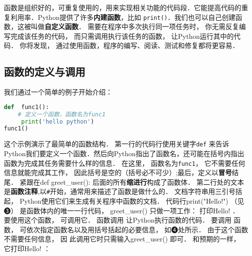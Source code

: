 函数是组织好的，可重复使用的，用来实现相关功能的代码段．它能提高代码的重复利用率．Python提供了许多\textbf{内建函数}，比如 \verb|print()|．我们也可以自己创建函数，这被叫做\textbf{自定义函数}． 需要在程序中多次执行同一项任务时， 你无需反复编写完成该任务的代码， 而只需调用执行该任务的函数， 让Python运行其中的代码． 你将发现， 通过使用函数，程序的编写、阅读、测试和修复都将更容易．

\subsection{函数的定义与调用}
我们通过一个简单的例子开始介绍：
\begin{lstlisting}[language=python]
def  func1():
    # 定义一个函数，函数名为func1
     print('hello python')
func1()
\end{lstlisting}
这个示例演示了最简单的函数结构． 第一行的代码行使用关键字\verb|def| 来告诉Python我们要定义一个函数．然后向Python指出了函数名，还可能在括号内指出函数为完成其任务需要什么样的信息． 在这里， 函数名为\verb|func1|， 它不需要任何信息就能完成其工作， 因此括号是空的（括号必不可少）;最后，定义以\textbf{冒号}结尾．
紧跟在def greet_user(): 后面的所有\textbf{缩进行}构成了函数体． 第二行处的文本是\textbf{函数注释},以\verb|#|开始，通常用来描述了函数是做什么的． 文档字符串用三引号括起， Python使用它们来生成有关程序中函数的文档．
代码行print("Hello!") （见❸） 是函数体内的唯一一行代码， greet_user() 只做一项工作： 打印Hello! ．
要使用这个函数， 可调用它． 函数调用 让Python执行函数的代码． 要调用 函数， 可依次指定函数名以及用括号括起的必要信息， 如❹处所示． 由于这个函数不需要任何信息， 因
此调用它时只需输入greet_user() 即可． 和预期的一样， 它打印Hello! ：